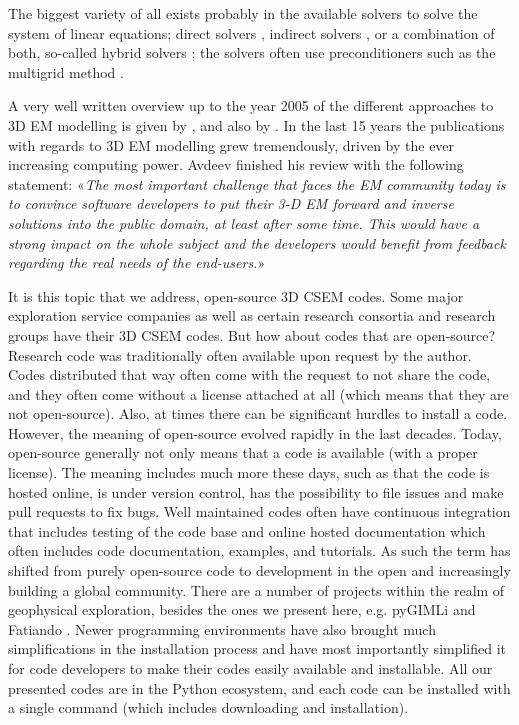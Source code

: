 \documentclass[
    paper,
  ]{geophysics}
\begin{document}
The biggest variety of all exists probably in the available solvers to solve
the system of linear equations; direct solvers \citep{GEO.09.Streich,
GEO.15.Grayver, GP.14.Chung, GEO.14.Jaysaval, SEG.15.Oh, GJI.18.Wang}, indirect
solvers \citep{GP.06.Mulder, GJI.15.Jaysaval}, or a combination of both,
so-called hybrid solvers \citep{GEO.18.Liu}; the solvers often use
preconditioners such as the multigrid method \citep{SIAM.02.Aruliah,
GP.06.Mulder, GJI.16.Jaysaval}.

A very well written overview up to the year 2005 of the different approaches to
3D EM modelling is given by \cite{SG.05.Avdeev}, and also by
\cite{SG.10.Borner}. In the last 15 years the publications with regards to 3D
EM  modelling grew tremendously, driven by the ever increasing computing power.
Avdeev finished his review with the following statement: «\emph{The most
important challenge that faces the EM community today is to convince software
developers to put their 3-D EM forward and inverse solutions into the public
domain, at least after some time. This would have a strong impact on the whole
subject and the developers would benefit from feedback regarding the real needs
of the end-users.}»

It is this topic that we address, open-source 3D CSEM codes. Some major
exploration service companies as well as certain research consortia and
research groups have their 3D CSEM codes. But how about codes that are
open-source? Research code was traditionally often available upon request by
the author. Codes distributed that way often come with the request to not share
the code, and they often come without a license attached at all (which means
that they are not open-source). Also, at times there can be significant hurdles
to install a code. However, the meaning of open-source evolved rapidly in the
last decades. Today, open-source generally not only means that a code is
available (with a proper license). The meaning includes much more these days,
such as that the code is hosted online, is under version control, has the
possibility to file issues and make pull requests to fix bugs. Well maintained
codes often have continuous integration that includes testing of the code base
and online hosted documentation which often includes code documentation,
examples, and tutorials. As such the term has shifted from purely open-source
code to development in the open and increasingly building a global community.
There are a number of projects within the realm of geophysical exploration,
besides the ones we present here, e.g.
pyGIMLi \citep{CAG.17.Rucker} and Fatiando \citep{JOSS.18.Uieda}. Newer
programming environments  have also brought
much simplifications in the installation process and have most importantly
simplified it for code developers to make their codes easily available and
installable. All our presented codes are in the Python ecosystem, and each code
can be installed with a single command (which includes downloading and
installation).
\end{document}
